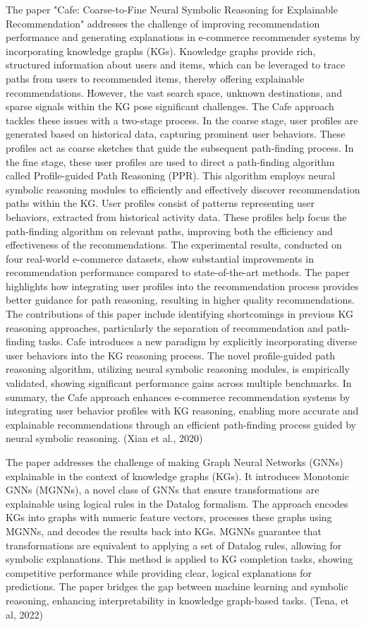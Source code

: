 The paper "Cafe: Coarse-to-Fine Neural Symbolic Reasoning for Explainable Recommendation" addresses the challenge of improving recommendation performance and generating explanations in e-commerce recommender systems by incorporating knowledge graphs (KGs). Knowledge graphs provide rich, structured information about users and items, which can be leveraged to trace paths from users to recommended items, thereby offering explainable recommendations. However, the vast search space, unknown destinations, and sparse signals within the KG pose significant challenges. The Cafe approach tackles these issues with a two-stage process. In the coarse stage, user profiles are generated based on historical data, capturing prominent user behaviors. These profiles act as coarse sketches that guide the subsequent path-finding process. In the fine stage, these user profiles are used to direct a path-finding algorithm called Profile-guided Path Reasoning (PPR). This algorithm employs neural symbolic reasoning modules to efficiently and effectively discover recommendation paths within the KG. User profiles consist of patterns representing user behaviors, extracted from historical activity data. These profiles help focus the path-finding algorithm on relevant paths, improving both the efficiency and effectiveness of the recommendations. The experimental results, conducted on four real-world e-commerce datasets, show substantial improvements in recommendation performance compared to state-of-the-art methods. The paper highlights how integrating user profiles into the recommendation process provides better guidance for path reasoning, resulting in higher quality recommendations. The contributions of this paper include identifying shortcomings in previous KG reasoning approaches, particularly the separation of recommendation and path-finding tasks. Cafe introduces a new paradigm by explicitly incorporating diverse user behaviors into the KG reasoning process. The novel profile-guided path reasoning algorithm, utilizing neural symbolic reasoning modules, is empirically validated, showing significant performance gains across multiple benchmarks. In summary, the Cafe approach enhances e-commerce recommendation systems by integrating user behavior profiles with KG reasoning, enabling more accurate and explainable recommendations through an efficient path-finding process guided by neural symbolic reasoning. (Xian et al., 2020)

The paper addresses the challenge of making Graph Neural Networks (GNNs) explainable in the context of knowledge graphs (KGs). It introduces Monotonic GNNs (MGNNs), a novel class of GNNs that ensure transformations are explainable using logical rules in the Datalog formalism. The approach encodes KGs into graphs with numeric feature vectors, processes these graphs using MGNNs, and decodes the results back into KGs. MGNNs guarantee that transformations are equivalent to applying a set of Datalog rules, allowing for symbolic explanations. This method is applied to KG completion tasks, showing competitive performance while providing clear, logical explanations for predictions. The paper bridges the gap between machine learning and symbolic reasoning, enhancing interpretability in knowledge graph-based tasks. (Tena, et al, 2022)

